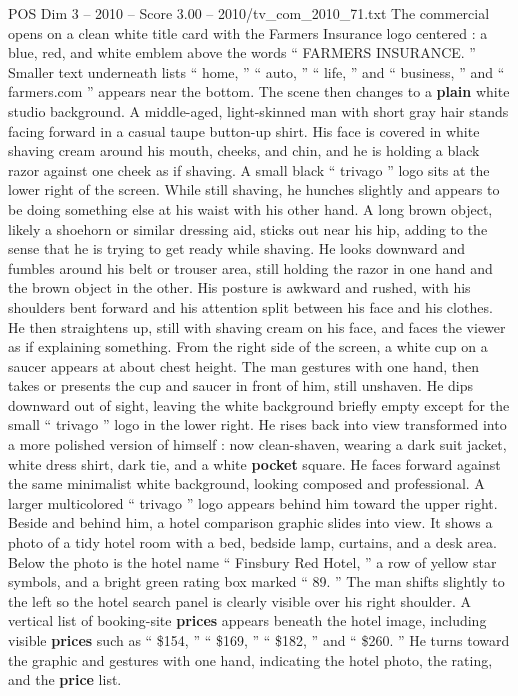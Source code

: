 \begin{textsample}{POS Dim 3 – 2010 – Score 3.00 – 2010/tv\_com\_2010\_71.txt}  \label{ex:f3_pos_088}
The commercial opens on a clean white title card with the Farmers Insurance logo centered : a blue, red, and white emblem above the words “ FARMERS INSURANCE. ” Smaller text underneath lists “ home, ” “ auto, ” “ life, ” and “ business, ” and “ farmers.com ” appears near the bottom.
The scene then changes to a \textbf{plain} white studio background.
A middle-aged, light-skinned man with short gray hair stands facing forward in a casual taupe button-up shirt.
His face is covered in white shaving cream around his mouth, cheeks, and chin, and he is holding a black razor against one cheek as if shaving.
A small black “ trivago ” logo sits at the lower right of the screen.
While still shaving, he hunches slightly and appears to be doing something else at his waist with his other hand.
A long brown object, likely a shoehorn or similar dressing aid, sticks out near his hip, adding to the sense that he is trying to get ready while shaving.
He looks downward and fumbles around his belt or trouser area, still holding the razor in one hand and the brown object in the other.
His posture is awkward and rushed, with his shoulders bent forward and his attention split between his face and his clothes.
He then straightens up, still with shaving cream on his face, and faces the viewer as if explaining something.
From the right side of the screen, a white cup on a saucer appears at about chest height.
The man gestures with one hand, then takes or presents the cup and saucer in front of him, still unshaven.
He dips downward out of sight, leaving the white background briefly empty except for the small “ trivago ” logo in the lower right.
He rises back into view transformed into a more polished version of himself : now clean-shaven, wearing a dark suit jacket, white dress shirt, dark tie, and a white \textbf{pocket} square.
He faces forward against the same minimalist white background, looking composed and professional.
A larger multicolored “ trivago ” logo appears behind him toward the upper right.
Beside and behind him, a hotel comparison graphic slides into view.
It shows a photo of a tidy hotel room with a bed, bedside lamp, curtains, and a desk area.
Below the photo is the hotel name “ Finsbury Red Hotel, ” a row of yellow star symbols, and a bright green rating box marked “ 89. ” The man shifts slightly to the left so the hotel search panel is clearly visible over his right shoulder.
A vertical list of booking-site \textbf{prices} appears beneath the hotel image, including visible \textbf{prices} such as “ \$154, ” “ \$169, ” “ \$182, ” and “ \$260. ” He turns toward the graphic and gestures with one hand, indicating the hotel photo, the rating, and the \textbf{price} list.

\end{textsample}
